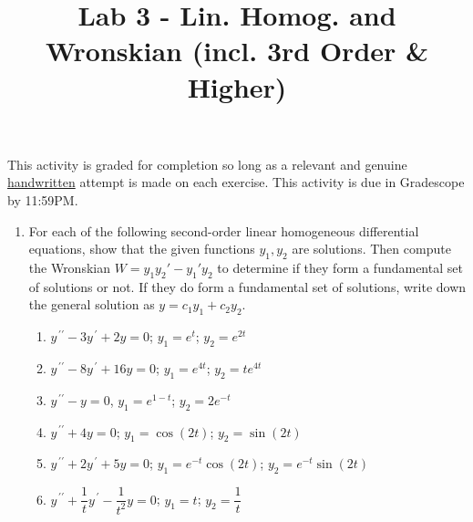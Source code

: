 \documentclass{ximera}
\begin{document}
\begin{abstract}
 \end{abstract}

    \title{Lab 3 - Lin. Homog. and Wronskian (incl. 3rd Order \& Higher)}
    
    \maketitle

This activity is graded for completion so long as a relevant and genuine \underline{handwritten} attempt is made on each exercise.  This activity is due in Gradescope by 11:59PM.


\begin{enumerate}

\item For each of the following second-order linear homogeneous differential equations, show that the given functions $y_1,y_2$ are solutions. Then compute the Wronskian $W=y_1y_2'-y_1'y_2$ to determine if they form a fundamental set of solutions or not.  If they do form a fundamental set of solutions, write down the general solution as $y=c_1y_1+c_2y_2$.\\

\begin{enumerate}
\item $y^{\,\prime\prime}-3y^{\,\prime}+2y=0$; $y_1=e^t$; $y_2=e^{2t}$

\vfill

\item $y^{\,\prime\prime}-8y^{\,\prime}+16y=0$; $y_1=e^{4t}$; $y_2=te^{4t}$

\vfill

\item $y^{\,\prime\prime}-y=0$, $y_1=e^{1-t}$; $y_2=2e^{-t}$

\vfill

\item $y^{\,\prime\prime}+4y=0$; $y_1=\cos{(2t)}$; $y_2=\sin{(2t)}$

\vfill


\item $y^{\,\prime\prime}+2y^{\,\prime}+5y=0$; $y_1=e^{-t}\cos{(2t)}$; $y_2=e^{-t}\sin{(2t)}$

\vfill

\item $y^{\,\prime\prime}+\dfrac{1}{t}y^{\,\prime}-\dfrac{1}{t^2}y=0$; $y_1=t$; $y_2=\dfrac{1}{t}$


\vfill


\end{enumerate}
\end{enumerate}
\end{document}

